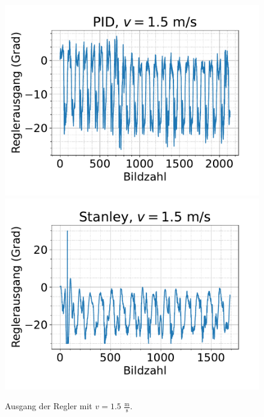 \documentclass[arbeit=studie,oneside,BCOR=12mm]{ArbeitRST}
\begin{document}
\begin{figure}[h]
    \centering
    \includegraphics[scale=0.47]{pid1.5}
    \includegraphics[scale=0.47]{Stan1.5}
    \caption{Ausgang der Regler mit $v = 1.5$ $\frac{\mathrm{m}}{\mathrm{s}}$.}
    \label{reg:1.5}
\end{figure}
\end{document}
